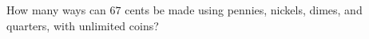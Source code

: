 How many ways can $ 67 $ cents be made using pennies, nickels, dimes, and quarters, with unlimited coins?
